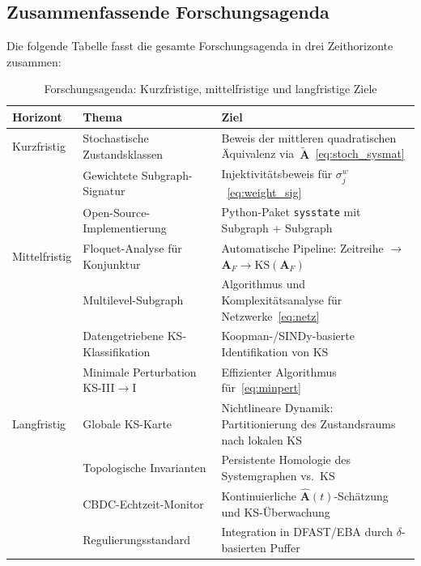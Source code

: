 \documentclass[a4paper, 12pt, twoside, openright]{report}
\theoremstyle{definition}
\theoremstyle{definition}
\newcommand{\vA}{\bm{A}}
\newcommand{\KS}{\mathrm{KS}}
\begin{document}
\subsection{Zusammenfassende Forschungsagenda}
\label{subsec:agenda}

Die folgende Tabelle fasst die gesamte Forschungsagenda in drei Zeithorizonte
zusammen:

\begin{table}[!t]
\centering
\caption{Forschungsagenda: Kurzfristige, mittelfristige und langfristige Ziele}
\label{tab:agenda}
\begin{tabular}{>{\raggedright\arraybackslash}p{2.2cm}
                >{\raggedright\arraybackslash}p{5.0cm}
                >{\raggedright\arraybackslash}p{5.0cm}}
\toprule
\textbf{Horizont} & \textbf{Thema} & \textbf{Ziel} \\
\midrule
Kurzfristig & Stochastische Zustandsklassen & Beweis der mittleren quadratischen
  Äquivalenz via~$\tilde{\vA}$~\eqref{eq:stoch_sysmat} \\
 & Gewichtete Subgraph-Signatur & Injektivitätsbeweis für $\sigma_j^w$~\eqref{eq:weight_sig} \\
 & Open-Source-Implementierung & Python-Paket \texttt{sysstate} mit Subgraph + Subgraph \\
\midrule
Mittelfristig & Floquet-Analyse für Konjunktur & Automatische Pipeline: Zeitreihe $\to$
  $\vA_F \to \KS(\vA_F)$ \\
 & Multilevel-Subgraph & Algorithmus und Komplexitätsanalyse für Netzwerke~\eqref{eq:netz} \\
 & Datengetriebene KS-Klassifikation & Koopman-/SINDy-basierte Identifikation von $\KS$ \\
 & Minimale Perturbation KS-III$\to$I & Effizienter Algorithmus für~\eqref{eq:minpert} \\
\midrule
Langfristig & Globale KS-Karte & Nichtlineare Dynamik: Partitionierung des
  Zustandsraums nach lokalen KS \\
 & Topologische Invarianten & Persistente Homologie des Systemgraphen vs.\ KS \\
 & CBDC-Echtzeit-Monitor & Kontinuierliche $\hat{\vA}(t)$-Schätzung und KS-Überwachung \\
 & Regulierungsstandard & Integration in DFAST/EBA durch $\delta$-basierten Puffer \\
\bottomrule
\end{tabular}
\end{table}
\end{document}
